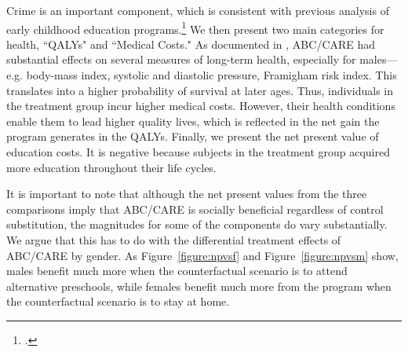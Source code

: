 Crime is an important component, which is consistent with previous analysis of early childhood education programs.\footnote{\citet{Heckman_Moon_etal_2010_RateofReturn}.} We then present two main categories for health, ``QALYs" and ``Medical Costs." As documented in \citet{Campbell_Conti_etal_2014_EarlyChildhoodInvestments}, ABC/CARE had substantial effects on several measures of long-term health, especially for males---e.g. body-mass index, systolic and diastolic pressure, Framigham risk index. This translates into a higher probability of survival at later ages. Thus, individuals in the treatment group incur higher medical costs. However, their health conditions enable them to lead higher quality lives, which is reflected in the net gain the program generates in the QALYs. Finally, we present the net present value of education costs. It is negative because subjects in the treatment group acquired more education throughout their life cycles.

It is important to note that although the net present values from the three comparisons imply that ABC/CARE is socially beneficial regardless of control substitution, the magnitudes for some of the components do vary substantially. We argue that this has to do with the differential treatment effects of ABC/CARE by gender. As Figure~\ref{figure:npvsf} and Figure~\ref{figure:npvsm} show, males benefit much more when the counterfactual scenario is to attend alternative preschools, while females benefit much more from the program when the counterfactual scenario is to stay at home.

